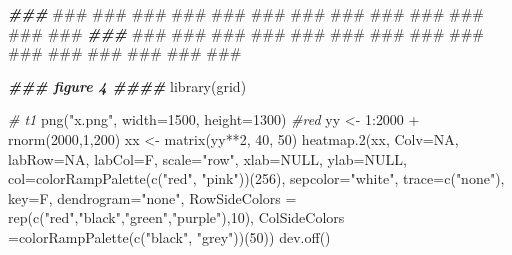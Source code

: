 \documentclass[
]{article}
\newenvironment{Shaded}{\begin{snugshade}}{\end{snugshade}}
\newcommand{\AlertTok}[1]{\textcolor[rgb]{0.94,0.16,0.16}{#1}}
\newcommand{\AttributeTok}[1]{\textcolor[rgb]{0.77,0.63,0.00}{#1}}
\newcommand{\CommentTok}[1]{\textcolor[rgb]{0.56,0.35,0.01}{\textit{#1}}}
\newcommand{\ConstantTok}[1]{\textcolor[rgb]{0.00,0.00,0.00}{#1}}
\newcommand{\DecValTok}[1]{\textcolor[rgb]{0.00,0.00,0.81}{#1}}
\newcommand{\DocumentationTok}[1]{\textcolor[rgb]{0.56,0.35,0.01}{\textbf{\textit{#1}}}}
\newcommand{\FunctionTok}[1]{\textcolor[rgb]{0.00,0.00,0.00}{#1}}
\newcommand{\NormalTok}[1]{#1}
\newcommand{\OtherTok}[1]{\textcolor[rgb]{0.56,0.35,0.01}{#1}}
\newcommand{\SpecialCharTok}[1]{\textcolor[rgb]{0.00,0.00,0.00}{#1}}
\newcommand{\StringTok}[1]{\textcolor[rgb]{0.31,0.60,0.02}{#1}}
\begin{document}
\begin{Shaded}
\begin{Highlighting}[]
\DocumentationTok{\#\#\# }\AlertTok{\#\#\#}\DocumentationTok{ }\AlertTok{\#\#\#}\DocumentationTok{ }\AlertTok{\#\#\#}\DocumentationTok{ }\AlertTok{\#\#\#}\DocumentationTok{ }\AlertTok{\#\#\#}\DocumentationTok{ }\AlertTok{\#\#\#}\DocumentationTok{ }\AlertTok{\#\#\#}\DocumentationTok{ }\AlertTok{\#\#\#}\DocumentationTok{ }\AlertTok{\#\#\#}\DocumentationTok{ }\AlertTok{\#\#\#}\DocumentationTok{ }\AlertTok{\#\#\#}\DocumentationTok{ }\AlertTok{\#\#\#}\DocumentationTok{ }\AlertTok{\#\#\#}\DocumentationTok{ }
\DocumentationTok{\#\#\# }\AlertTok{\#\#\#}\DocumentationTok{ }\AlertTok{\#\#\#}\DocumentationTok{ }\AlertTok{\#\#\#}\DocumentationTok{ }\AlertTok{\#\#\#}\DocumentationTok{ }\AlertTok{\#\#\#}\DocumentationTok{ }\AlertTok{\#\#\#}\DocumentationTok{ }\AlertTok{\#\#\#}\DocumentationTok{ }\AlertTok{\#\#\#}\DocumentationTok{ }\AlertTok{\#\#\#}\DocumentationTok{ }\AlertTok{\#\#\#}\DocumentationTok{ }\AlertTok{\#\#\#}\DocumentationTok{ }\AlertTok{\#\#\#}\DocumentationTok{ }\AlertTok{\#\#\#}\DocumentationTok{ }\AlertTok{\#\#\#}\DocumentationTok{ }\AlertTok{\#\#\#}\DocumentationTok{ }

\DocumentationTok{\#\#\# figure 4 \#\#\#\#}
\FunctionTok{library}\NormalTok{(grid) }

\CommentTok{\# t1 }
\FunctionTok{png}\NormalTok{(}\StringTok{"x.png"}\NormalTok{, }\AttributeTok{width=}\DecValTok{1500}\NormalTok{, }\AttributeTok{height=}\DecValTok{1300}\NormalTok{) }\CommentTok{\#red}
\NormalTok{yy }\OtherTok{\textless{}{-}} \DecValTok{1}\SpecialCharTok{:}\DecValTok{2000} \SpecialCharTok{+} \FunctionTok{rnorm}\NormalTok{(}\DecValTok{2000}\NormalTok{,}\DecValTok{1}\NormalTok{,}\DecValTok{200}\NormalTok{)}
\NormalTok{xx }\OtherTok{\textless{}{-}} \FunctionTok{matrix}\NormalTok{(yy}\SpecialCharTok{**}\DecValTok{2}\NormalTok{, }\DecValTok{40}\NormalTok{, }\DecValTok{50}\NormalTok{)}
\FunctionTok{heatmap.2}\NormalTok{(xx, }\AttributeTok{Colv=}\ConstantTok{NA}\NormalTok{, }\AttributeTok{labRow=}\ConstantTok{NA}\NormalTok{, }\AttributeTok{labCol=}\NormalTok{F, }\AttributeTok{scale=}\StringTok{"row"}\NormalTok{, }\AttributeTok{xlab=}\ConstantTok{NULL}\NormalTok{,}
          \AttributeTok{ylab=}\ConstantTok{NULL}\NormalTok{, }\AttributeTok{col=}\FunctionTok{colorRampPalette}\NormalTok{(}\FunctionTok{c}\NormalTok{(}\StringTok{"red"}\NormalTok{, }\StringTok{"pink"}\NormalTok{))(}\DecValTok{256}\NormalTok{),  }
        \AttributeTok{sepcolor=}\StringTok{"white"}\NormalTok{, }\AttributeTok{trace=}\FunctionTok{c}\NormalTok{(}\StringTok{"none"}\NormalTok{), }\AttributeTok{key=}\NormalTok{F, }\AttributeTok{dendrogram=}\StringTok{"none"}\NormalTok{,}
        \AttributeTok{RowSideColors =} \FunctionTok{rep}\NormalTok{(}\FunctionTok{c}\NormalTok{(}\StringTok{"red"}\NormalTok{,}\StringTok{"black"}\NormalTok{,}\StringTok{"green"}\NormalTok{,}\StringTok{"purple"}\NormalTok{),}\DecValTok{10}\NormalTok{),}
        \AttributeTok{ColSideColors =}\FunctionTok{colorRampPalette}\NormalTok{(}\FunctionTok{c}\NormalTok{(}\StringTok{"black"}\NormalTok{, }\StringTok{"grey"}\NormalTok{))(}\DecValTok{50}\NormalTok{))}
\FunctionTok{dev.off}\NormalTok{()}
\end{Highlighting}
\end{Shaded}
\end{document}
